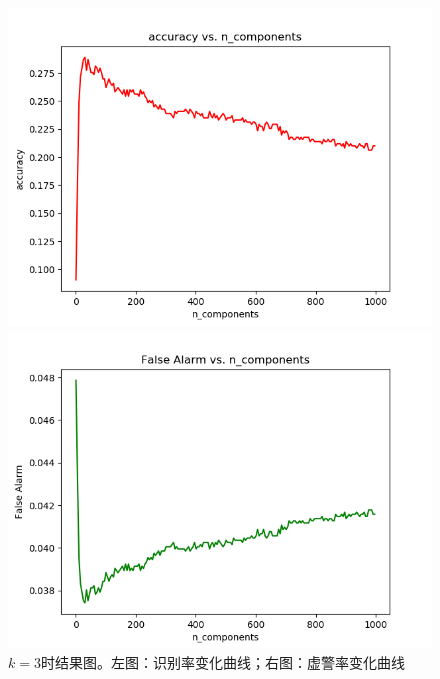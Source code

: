 \documentclass[cn]{elegantbook}
\begin{document}
\begin{figure}[!h]
	\centering
	\begin{minipage}[t]{0.48\textwidth}
		\centering
		\includegraphics[width=\textwidth]{../results/acc_n_3}
	\end{minipage}
	\begin{minipage}[t]{0.48\textwidth}
		\centering
		\includegraphics[width=\textwidth]{../results/falseAlarm_n_3}
	\end{minipage}
	\caption{\label{knn_res_2}$k=3$时结果图。左图：识别率变化曲线；右图：虚警率变化曲线}
\end{figure}
\end{document}
